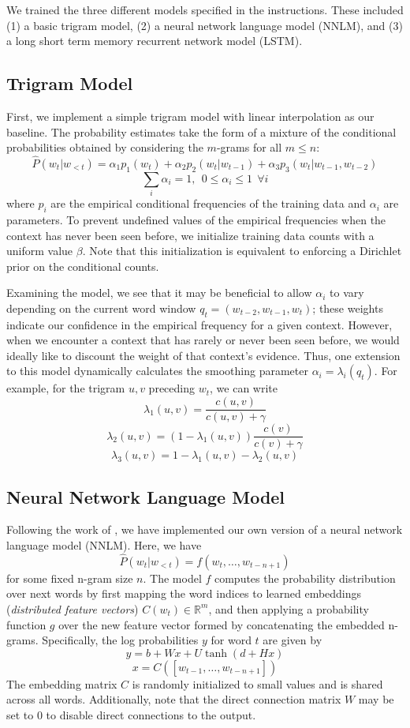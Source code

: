 \documentclass[11pt]{article}
\begin{document}
We trained the three different models specified in the instructions.  These included (1) a basic trigram model, (2) a neural network language model (NNLM), and (3) a long short term memory recurrent network model (LSTM).

\subsection{Trigram Model}
First, we implement a simple trigram model with linear interpolation as our baseline. The probability estimates take the form of a mixture of the conditional probabilities obtained by considering the $m$-grams for all $m\leq n$:
\[
\hat{P}(w_t \vert w_{<t}) = 
\alpha_1 p_1(w_t) + 
\alpha_2 p_2(w_t \vert w_{t-1}) + 
\alpha_3 p_3(w_t \vert w_{t-1}, w_{t-2})
\]
\[
\sum_i \alpha_i = 1, \ \ 0\leq \alpha_i\leq 1 \ \ \forall i
\]
where $p_i$ are the empirical conditional frequencies of the training data and $\alpha_i$ are parameters. To prevent undefined values of the empirical frequencies when the context has never been seen before, we initialize training data counts with a uniform value $\beta$. Note that this initialization is equivalent to enforcing a Dirichlet prior on the conditional counts.

Examining the model, we see that it may be beneficial to allow $\alpha_i$ to vary depending on the current word window $q_t = (w_{t-2}, w_{t-1}, w_t)$; these weights indicate our confidence in the empirical frequency for a given context. However, when we encounter a context that has rarely or never been seen before, we would ideally like to discount the weight of that context's evidence. Thus, one extension to this model dynamically calculates the smoothing parameter $\alpha_i = \lambda_i(q_t)$. For example, for the trigram $u, v$ preceding $w_t$, we can write
\[
\lambda_1(u, v) = \frac{c(u, v)}{c(u, v) + \gamma}
\] \[
\lambda_2(u, v) = (1 - \lambda_1(u, v)) \frac{c(v)}{c(v) + \gamma}
\] \[
\lambda_3(u, v) = 1 - \lambda_1(u, v) - \lambda_2(u, v)
\] 

\subsection{Neural Network Language Model}
Following the work of \cite{nnlm}, we have implemented our own version of a neural network language model (NNLM). Here, we have
\[
\hat{P}(w_t \vert w_{<t}) = f(w_t, \dots, w_{t-n+1})
\]
for some fixed n-gram size $n$. The model $f$ computes the probability distribution over next words by first mapping the word indices to learned embeddings (\textit{distributed feature vectors}) $C(w_t) \in \mathbb{R}^m$, and then applying a probability function $g$ over the new feature vector formed by concatenating the embedded n-grams. Specifically, the log probabilities $y$ for word $t$ are given by
\[
y = b + Wx + U \tanh(d + Hx)
\]
\[
x = C([w_{t-1}, \dots, w_{t-n+1}])
\]
The embedding matrix $C$ is randomly initialized to small values and is shared across all words. Additionally, note that the direct connection matrix $W$ may be set to 0 to disable direct connections to the output.
\end{document}
